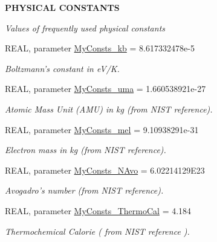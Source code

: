 \begin{Indent}{\bf PHYSICAL CONSTANTS}\par
{\em \label{_amgrpb70515a7c0eef9512cf1cb068a7ba792}
Values of frequently used physical constants }\begin{DoxyCompactItemize}
\item 
REAL, parameter \hyperlink{namespace_my_consts_a8ec037cf234b67a520136aaea3133b7c}{MyConsts\_\-kb} = 8.617332478e-\/5
\begin{DoxyCompactList}\small\item\em Boltzmann's constant in eV/K. \item\end{DoxyCompactList}\item 
REAL, parameter \hyperlink{namespace_my_consts_a3b04681501dc44eeb3701aa7ee2f220e}{MyConsts\_\-uma} = 1.660538921e-\/27
\begin{DoxyCompactList}\small\item\em Atomic Mass Unit (AMU) in kg (from NIST reference). \item\end{DoxyCompactList}\item 
REAL, parameter \hyperlink{namespace_my_consts_aa1367128efaba1f65ead2ceb9f64db46}{MyConsts\_\-mel} = 9.10938291e-\/31
\begin{DoxyCompactList}\small\item\em Electron mass in kg (from NIST reference). \item\end{DoxyCompactList}\item 
REAL, parameter \hyperlink{namespace_my_consts_a9d0cf18aaa762022e93aa97d649e6cbd}{MyConsts\_\-NAvo} = 6.02214129E23
\begin{DoxyCompactList}\small\item\em Avogadro's number (from NIST reference). \item\end{DoxyCompactList}\item 
REAL, parameter \hyperlink{namespace_my_consts_ac5ba183f9282fe2c8554f8b9f5c7d5d1}{MyConsts\_\-ThermoCal} = 4.184
\begin{DoxyCompactList}\small\item\em Thermochemical Calorie ( from NIST reference ). \item\end{DoxyCompactList}\end{DoxyCompactItemize}
\end{Indent}
